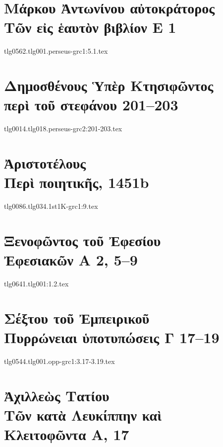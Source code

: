 \documentclass[a4paper,12pt,twoside]{report}
\begin{document}
\chapter[Μάρκου Ἀντωνίνου Τῶν εἰς ἑαυτόν Ε 1]{\textgreek[variant=ancient]{Μάρκου Ἀντωνίνου αὐτοκράτορος \\Τῶν εἰς ἑαυτὸν βιβλίον Ε} 1}
{tlg0562.tlg001.perseus-grc1:5.1.tex}
\chapter[Δημοσθένους Περὶ τοῦ στεφάνου]{\textgreek[variant=ancient]{Δημοσθένους Ὑπὲρ Κτησιφῶντος \\περὶ τοῦ στεφάνου} 201–203}
{tlg0014.tlg018.perseus-grc2:201-203.tex}

\chapter[Ἀριστοτέλους Περὶ ποιητικῆς]{\textgreek[variant=ancient]{Ἀριστοτέλους \\Περὶ ποιητικῆς,} 1451b}

{tlg0086.tlg034.1st1K-grc1:9.tex}

\chapter[Ξενοφῶντος τοῦ Ἐφεσίου Ἐφεσιακῶν Α]{\textgreek[variant=ancient]{Ξενοφῶντος τοῦ Ἐφεσίου \\Ἐφεσιακῶν Α} 2, 5–9}

{tlg0641.tlg001:1.2.tex}

\chapter[Σέξτου τοῦ Ἐμπειρικοῦ Πυρρώνειαι\dots\ Γ]{\textgreek[variant=ancient]{Σέξτου τοῦ Ἐμπειρικοῦ \\Πυρρώνειαι ὑποτυπώσεις Γ} 17–19}

{tlg0544.tlg001.opp-grc1:3.17-3.19.tex}
%


\chapter[Ἀχιλλεὼς Τατίου Τῶν κατὰ Λευκίππην\dots]{\textgreek[variant=ancient]{Ἀχιλλεὼς Τατίου \\Τῶν κατὰ Λευκίππην καὶ\\ Κλειτοφῶντα Α,} 17}
\end{document}
